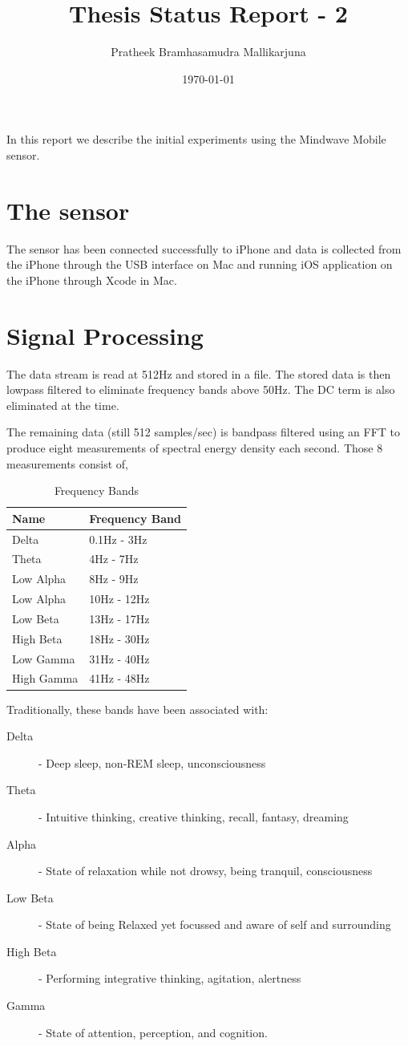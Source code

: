 \documentclass[11pt]{article}
\title{Thesis Status Report - 2}
\author{Pratheek Bramhasamudra Mallikarjuna}
\date{\today}                                           %
\begin{document}
\maketitle
In this report we describe the initial experiments using the Mindwave Mobile sensor. 
\section{The sensor}
	The sensor has been connected successfully to iPhone and data is collected from the iPhone through the USB interface on Mac and running iOS application on the iPhone through Xcode in Mac.

\section{Signal Processing}
	The data stream is read at 512Hz and stored in a file. The stored data is then lowpass filtered to eliminate frequency bands above 50Hz. The DC term is also eliminated at the time.

	The remaining data (still 512 samples/sec) is bandpass filtered using an FFT to produce eight measurements of spectral energy density each second. Those 8 measurements consist of,

	\begin{table}[h]
		\centering
		\caption{Frequency Bands}
		\label{Bands}
		\begin{tabular}{l l}
			\hline
			Name &Frequency Band\\\hline
			Delta&0.1Hz - 3Hz\\
			Theta&4Hz - 7Hz\\
			Low Alpha&8Hz - 9Hz\\
			Low Alpha&10Hz - 12Hz\\
			Low Beta&13Hz - 17Hz\\
			High Beta&18Hz - 30Hz\\
			Low Gamma&31Hz - 40Hz\\
			High Gamma&41Hz - 48Hz\\
		\end{tabular}
	\end{table}

	Traditionally, these bands have been associated with:
	\begin{description}
		\item[Delta] - Deep sleep, non-REM sleep, unconsciousness
		\item [Theta] - Intuitive thinking, creative thinking, recall, fantasy, dreaming
		\item [Alpha] - State of relaxation while not drowsy, being tranquil, consciousness
		\item [Low Beta] - State of being Relaxed yet focussed and aware of self and surrounding
		\item [High Beta] - Performing integrative thinking, agitation, alertness
		\item [Gamma] - State of attention, perception, and cognition.
	\end{description}
 
\end{document}
